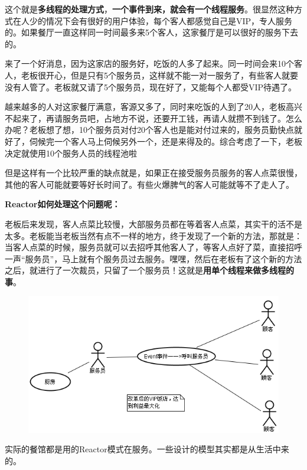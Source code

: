 \documentclass[UTF8,a4paper,8pt]{ctexbook}
\begin{document}
			这个就是\textbf{多线程的处理方式}，\textbf{一个事件到来，就会有一个线程服务}。很显然这种方式在人少的情况下会有很好的用户体验，每个客人都感觉自己是VIP，专人服务的。如果餐厅一直这样同一时间最多来5个客人，这家餐厅是可以很好的服务下去的。
			
			来了一个好消息，因为这家店的服务好，吃饭的人多了起来。同一时间会来10个客人，老板很开心，但是只有5个服务员，这样就不能一对一服务了，有些客人就要没有人管了。老板就又请了5个服务员，现在好了，又能每个人都受VIP待遇了。
			
			越来越多的人对这家餐厅满意，客源又多了，同时来吃饭的人到了20人，老板高兴不起来了，再请服务员吧，占地方不说，还要开工钱，再请人就攒不到钱了。怎么办呢？老板想了想，10个服务员对付20个客人也是能对付过来的，服务员勤快点就好了，伺候完一个客人马上伺候另外一个，还是来得及的。综合考虑了一下，老板决定就使用10个服务人员的线程池啦
			
			但是这样有一个比较严重的缺点就是，如果正在接受服务员服务的客人点菜很慢，其他的客人可能就要等好长时间了。有些火爆脾气的客人可能就等不了走人了。
			
			\textbf{Reactor如何处理这个问题呢：}
			
			老板后来发现，客人点菜比较慢，大部服务员都在等着客人点菜，其实干的活不是太多。老板能当老板当然有点不一样的地方，终于发现了一个新的方法，那就是：当客人点菜的时候，服务员就可以去招呼其他客人了，等客人点好了菜，直接招呼一声“服务员”，马上就有个服务员过去服务。嘿嘿，然后在老板有了这个新的方法之后，就进行了一次裁员，只留了一个服务员！这就是\textbf{用单个线程来做多线程的事}。
			
				\begin{figure}[h]
					\centering
					\includegraphics[scale = 0.8]{ReactorExample.png}
				\end{figure}
			
			实际的餐馆都是用的Reactor模式在服务。一些设计的模型其实都是从生活中来的。
			
\end{document}
